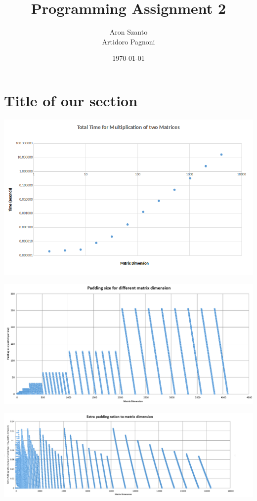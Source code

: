 \documentclass[11pt]{article}
\begin{document}
\title{Programming Assignment 2}
\author{Aron Szanto\\
 Artidoro Pagnoni}
\date{\today}
\maketitle


\section*{Title of our section}

\begin{center}
\includegraphics[scale=0.8]{totaltime}
\end{center}


\begin{center}
\includegraphics[scale=0.65]{paddingsize}
\end{center}


\begin{center}
\includegraphics[scale=0.6]{padddingration}
\end{center}
\end{document}
